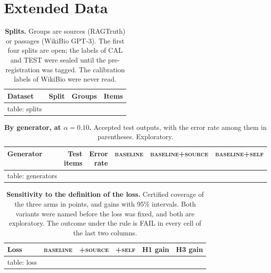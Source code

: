 \documentclass[11pt]{article}
\newcommand{\arm}[1]{\textsc{#1}}
\begin{document}
\clearpage
\section*{Extended Data}
\setcounter{table}{0}
\renewcommand{\tablename}{Extended Data Table}

\begin{table}[h]
\centering
\small
\caption{\textbf{Splits.} Groups are sources (RAGTruth) or passages (WikiBio GPT-3). The first four splits are open; the labels of CAL and TEST were sealed until the pre-registration was tagged. The calibration labels of WikiBio were never read.}
\label{tab:splits}
\begin{tabular}{@{}llrr@{}}
\toprule
Dataset & Split & Groups & Items \\
\midrule
{{table: splits}}
\bottomrule
\end{tabular}
\end{table}

\begin{table}[h]
\centering
\small
\caption{\textbf{By generator, at $\alpha = 0.10$.} Accepted test outputs, with the error rate among them in parentheses. Exploratory.}
\label{tab:generators}
\begin{tabular}{@{}lrrlll@{}}
\toprule
Generator & \shortstack[r]{Test\\items} & \shortstack[r]{Error\\rate} & \arm{baseline} & \arm{baseline+source} & \arm{baseline+self} \\
\midrule
{{table: generators}}
\bottomrule
\end{tabular}
\end{table}

\begin{table}[h]
\centering
\small
\caption{\textbf{Sensitivity to the definition of the loss.} Certified coverage of the three arms in points, and gains with 95\% intervals. Both variants were named before the loss was fixed, and both are exploratory. The outcome under the rule is FAIL in every cell of the last two columns.}
\label{tab:loss}
\footnotesize
\setlength{\tabcolsep}{4.5pt}
\begin{tabular}{@{}lrrrll@{}}
\toprule
Loss & \arm{baseline} & \arm{+source} & \arm{+self} & H1 gain & H3 gain \\
\midrule
{{table: loss}}
\bottomrule
\end{tabular}
\end{table}
\end{document}
